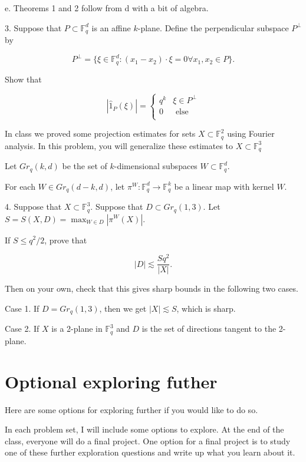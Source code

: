 \documentclass{amsart}
\newcommand{\FF}{\mathbb{F}}
\begin{document}
e.  Theorems 1 and 2 follow from d with a bit of algebra.

\vskip10pt

3.  Suppose that $P \subset \FF_q^d$ is an affine $k$-plane.   Define the perpendicular subspace $P^\perp$ by

$$ P^\perp = \{ \xi \in \FF_q^d: (x_1 - x_2) \cdot \xi = 0 \forall x_1, x_2 \in P \}.  $$

Show that

$$ | \hat 1_P(\xi)| = \begin{cases} q^k & \xi \in P^\perp \\ 0 & \textrm{ else} \\
\end{cases}$$

\vskip10pt

In class we proved some projection estimates for sets $X \subset \FF_q^2$ using Fourier analysis.  In this problem,  you will generalize these estimates to $X \subset \FF_q^3$

Let $Gr_q(k, d)$ be the set of $k$-dimensional subspaces $W \subset \FF_q^d$.   

For each $W \in Gr_q(d-k,d)$,  let $\pi^W: \FF_q^d \rightarrow \FF_q^k$ be a linear map with kernel $W$.

\vskip10pt

4.  Suppose that $X \subset \FF_q^3$.   Suppose that $D \subset Gr_q(1,3)$.   Let $S = S(X,D) = \max_{W \in D} | \pi^W(X)|$.

If $S \le q^2/2$,  prove that

\begin{equation} \label{falc3} |D| \lesssim \frac{S q^2}{|X|}.
\end{equation}

Then on your own,  check that this gives sharp bounds in the following two cases.

Case 1.  If $D = Gr_q(1,3)$,  then we get $|X| \lesssim S$,  which is sharp.

Case 2.  If $X$ is a 2-plane in $\FF_q^3$ and $D$ is the set of directions tangent to the 2-plane.


\section{Optional exploring futher}

Here are some options for exploring further if you would like to do so.

In each problem set,  I will include some options to explore.   At the end of the class, everyone will do a final project.   One option for a final project is to study one of these further exploration questions and write up what you learn about it.
\end{document}
